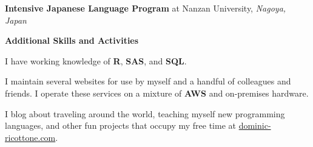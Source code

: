 \documentclass[12pt]{article}
\begin{document}
\vspace{.75em}

\textbf{Intensive Japanese Language Program} at Nanzan University, \textit{Nagoya, Japan}



\vspace{1.75em}



\textbf{\Large Additional Skills and Activities} \hrulefill

\vspace{.75em}

I have working knowledge of \textbf{R}, \textbf{SAS}, and \textbf{SQL}.

\vspace{.75em}

I maintain several websites for use by myself and a handful of colleagues and friends. I operate these services on a mixture of \textbf{AWS} and on-premises hardware.

\vspace{.75em}

I blog about traveling around the world, teaching myself new programming languages, and other fun projects that occupy my free time at \href{https://www.dominic-ricottone.com}{dominic-ricottone.com}.
\end{document}
